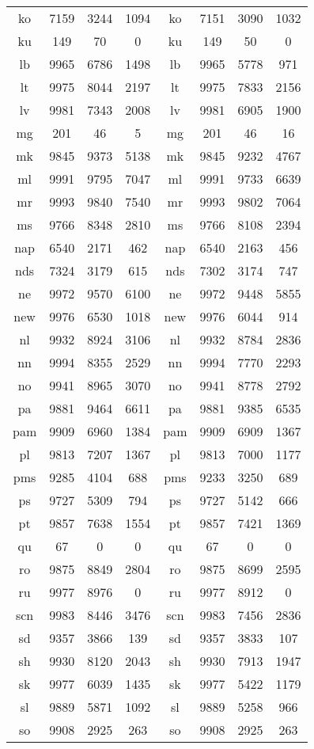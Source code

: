 \begin{figure}[h]
\centering
\begin{tabular}{cccc|cccc}
ko&7159&3244&1094&	ko&7151&3090&1032\\
ku&149&70&0&	ku&149&50&0\\
lb&9965&6786&1498&	lb&9965&5778&971\\
lt&9975&8044&2197&	lt&9975&7833&2156\\
lv&9981&7343&2008&	lv&9981&6905&1900\\
mg&201&46&5&	mg&201&46&16\\
mk&9845&9373&5138&	mk&9845&9232&4767\\
ml&9991&9795&7047&	ml&9991&9733&6639\\
mr&9993&9840&7540&	mr&9993&9802&7064\\
ms&9766&8348&2810&	ms&9766&8108&2394\\
nap&6540&2171&462&	nap&6540&2163&456\\
nds&7324&3179&615&	nds&7302&3174&747\\
ne&9972&9570&6100&	ne&9972&9448&5855\\
new&9976&6530&1018&	new&9976&6044&914\\
nl&9932&8924&3106&	nl&9932&8784&2836\\
nn&9994&8355&2529&	nn&9994&7770&2293\\
no&9941&8965&3070&	no&9941&8778&2792\\
pa&9881&9464&6611&	pa&9881&9385&6535\\
pam&9909&6960&1384&	pam&9909&6909&1367\\
pl&9813&7207&1367&	pl&9813&7000&1177\\
pms&9285&4104&688&	pms&9233&3250&689\\
ps&9727&5309&794&	ps&9727&5142&666\\
pt&9857&7638&1554&	pt&9857&7421&1369\\
qu&67&0&0&	qu&67&0&0\\
ro&9875&8849&2804&	ro&9875&8699&2595\\
ru&9977&8976&0&	ru&9977&8912&0\\
scn&9983&8446&3476&	scn&9983&7456&2836\\
sd&9357&3866&139&	sd&9357&3833&107\\
sh&9930&8120&2043&	sh&9930&7913&1947\\
sk&9977&6039&1435&	sk&9977&5422&1179\\
sl&9889&5871&1092&	sl&9889&5258&966\\
so&9908&2925&263&	so&9908&2925&263\\

\end{tabular}
\end{figure}
